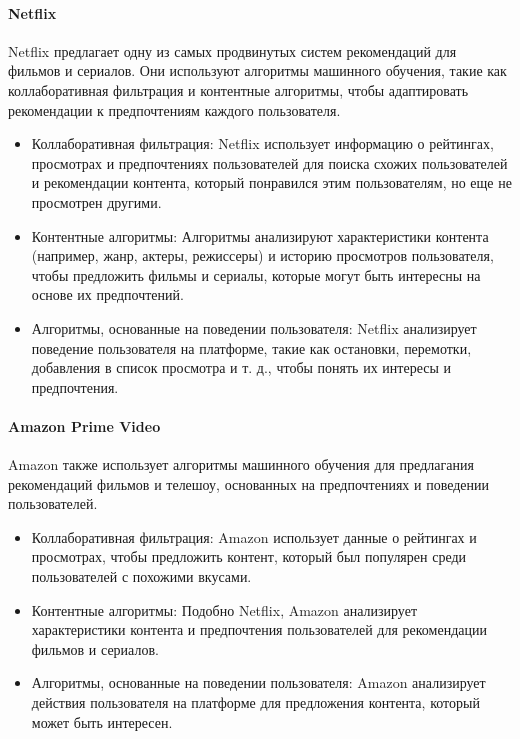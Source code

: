 \paragraph{Netflix}\par
Netflix предлагает одну из самых продвинутых систем рекомендаций для фильмов и сериалов.
Они используют алгоритмы машинного обучения, такие как коллаборативная фильтрация и контентные алгоритмы, чтобы
адаптировать рекомендации к предпочтениям каждого пользователя.
\begin{itemize}
	\item Коллаборативная фильтрация:
	Netflix использует информацию о рейтингах, просмотрах и предпочтениях пользователей для поиска схожих пользователей
	и рекомендации контента, который понравился этим пользователям, но еще не просмотрен другими.
	\item Контентные алгоритмы:
	Алгоритмы анализируют характеристики контента (например, жанр, актеры, режиссеры) и историю просмотров пользователя,
	чтобы предложить фильмы и сериалы, которые могут быть интересны на основе их предпочтений.
	\item Алгоритмы, основанные на поведении пользователя:
	Netflix анализирует поведение пользователя на платформе, такие как остановки, перемотки, добавления в список
	просмотра и т. д., чтобы понять их интересы и предпочтения.
\end{itemize}

\paragraph{Amazon Prime Video}

Amazon также использует алгоритмы машинного обучения для предлагания рекомендаций фильмов и телешоу,
основанных на предпочтениях и поведении пользователей.

\begin{itemize}
	\item Коллаборативная фильтрация:
	Amazon использует данные о рейтингах и просмотрах, чтобы предложить контент, который был популярен среди
	пользователей с похожими вкусами.
	\item Контентные алгоритмы:
	Подобно Netflix, Amazon анализирует характеристики контента и предпочтения пользователей для рекомендации фильмов
	и сериалов.
	\item Алгоритмы, основанные на поведении пользователя:
	Amazon анализирует действия пользователя на платформе для предложения контента, который может быть интересен.
\end{itemize}

